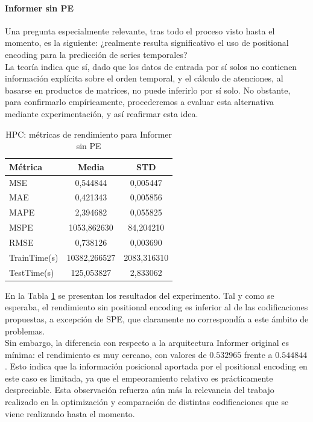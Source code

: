 \paragraph{Informer sin PE}

Una pregunta especialmente relevante, tras todo el proceso visto hasta el momento, es la siguiente: ¿realmente resulta significativo el uso de positional encoding para la predicción de series temporales?\\

La teoría indica que sí, dado que los datos de entrada por sí solos no contienen información explícita sobre el orden temporal, y el cálculo de atenciones, al basarse en productos de matrices, no puede inferirlo por sí solo.  No obstante, para confirmarlo empíricamente, procederemos a evaluar esta alternativa mediante experimentación, y así reafirmar esta idea.

\begin{table}[!ht]
	\centering
	\begin{tabular}{l|c|c}
		\toprule
		Métrica & Media & STD \\
		\midrule
		MSE & 0,544844 & 0,005447 \\
		MAE & 0,421343 & 0,005856 \\
		MAPE & 2,394682 & 0,055825 \\
		MSPE & 1053,862630 & 84,204210 \\
		RMSE & 0,738126 & 0,003690 \\
		TrainTime(s) & 10382,266527 & 2083,316310 \\
		TestTime(s) & 125,053827 & 2,833062 \\
		\bottomrule
	\end{tabular}
	\caption{HPC: métricas de rendimiento para Informer sin PE}
	\label{hpcnope}
\end{table}

En la Tabla \ref{hpcnope} se presentan los resultados del experimento. Tal y como se esperaba, el rendimiento sin positional encoding es inferior al de las codificaciones propuestas, a excepción de SPE, que claramente no correspondía a este ámbito de problemas.\\

Sin embargo, la diferencia con respecto a la arquitectura Informer original es mínima: el rendimiento es muy cercano, con valores de $0.532965$ frente a $0.544844$. Esto indica que la información posicional aportada por el positional encoding en este caso es limitada, ya que el empeoramiento relativo es prácticamente despreciable. Esta observación refuerza aún más la relevancia del trabajo realizado en la optimización y comparación de distintas codificaciones que se viene realizando hasta el momento.

